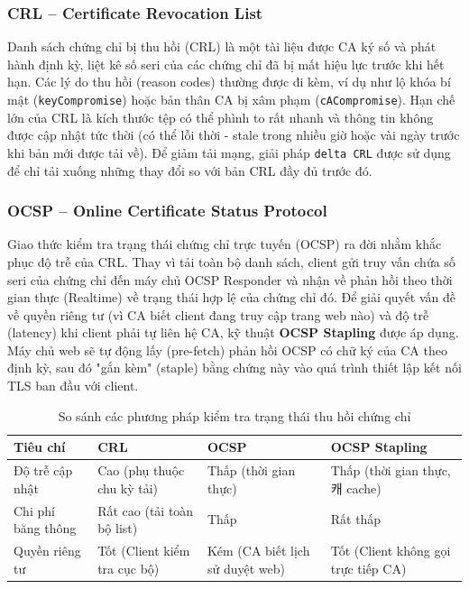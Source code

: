 \subsubsection*{CRL -- Certificate Revocation List}
Danh sách chứng chỉ bị thu hồi (CRL) là một tài liệu được CA ký số và phát hành định kỳ, liệt kê số seri của các chứng chỉ đã bị mất hiệu lực trước khi hết hạn. Các lý do thu hồi (reason codes) thường được đi kèm, ví dụ như lộ khóa bí mật (\texttt{keyCompromise}) hoặc bản thân CA bị xâm phạm (\texttt{cACompromise}). Hạn chế lớn của CRL là kích thước tệp có thể phình to rất nhanh và thông tin không được cập nhật tức thời (có thể lỗi thời - stale trong nhiều giờ hoặc vài ngày trước khi bản mới được tải về). Để giảm tải mạng, giải pháp \texttt{delta CRL} \cite{RFC5280} được sử dụng để chỉ tải xuống những thay đổi so với bản CRL đầy đủ trước đó.

\subsubsection*{OCSP -- Online Certificate Status Protocol}
Giao thức kiểm tra trạng thái chứng chỉ trực tuyến (OCSP) \cite{RFC6960} ra đời nhằm khắc phục độ trễ của CRL. Thay vì tải toàn bộ danh sách, client gửi truy vấn chứa số seri của chứng chỉ đến máy chủ OCSP Responder và nhận về phản hồi theo thời gian thực (Realtime) về trạng thái hợp lệ của chứng chỉ đó. Để giải quyết vấn đề về quyền riêng tư (vì CA biết client đang truy cập trang web nào) và độ trễ (latency) khi client phải tự liên hệ CA, kỹ thuật \textbf{OCSP Stapling} \cite{RFC6066} được áp dụng. Máy chủ web sẽ tự động lấy (pre-fetch) phản hồi OCSP có chữ ký của CA theo định kỳ, sau đó "gắn kèm" (staple) bằng chứng này vào quá trình thiết lập kết nối TLS ban đầu với client.

\begin{table}[h]
    \centering
    \caption{So sánh các phương pháp kiểm tra trạng thái thu hồi chứng chỉ}
    \label{tab:revocation}
    \begin{tabular}{|p{3cm}|p{4cm}|p{4cm}|p{4cm}|}
        \hline
        \textbf{Tiêu chí} & \textbf{CRL} & \textbf{OCSP} & \textbf{OCSP Stapling} \\
        \hline
        Độ trễ cập nhật & Cao (phụ thuộc chu kỳ tải) & Thấp (thời gian thực) & Thấp (thời gian thực, 캐 cache) \\
        \hline
        Chi phí băng thông & Rất cao (tải toàn bộ list) & Thấp & Rất thấp \\
        \hline
        Quyền riêng tư & Tốt (Client kiểm tra cục bộ) & Kém (CA biết lịch sử duyệt web) & Tốt (Client không gọi trực tiếp CA) \\
        \hline
    \end{tabular}
\end{table}


